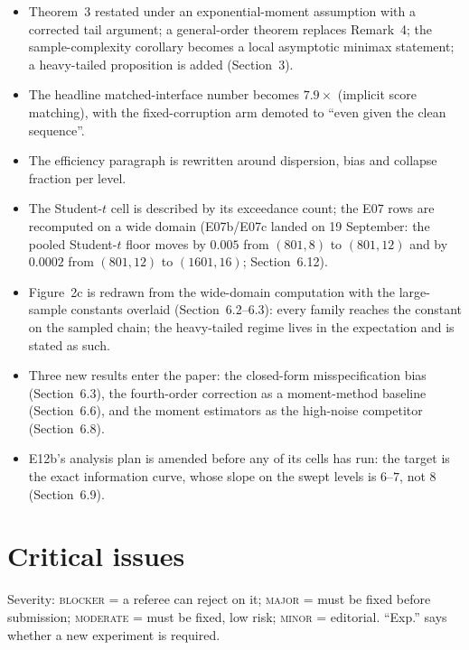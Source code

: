 \documentclass[11pt,a4paper]{article}
\newcommand{\sev}[1]{\textsc{#1}}
\theoremstyle{definition}
\theoremstyle{remark}
\begin{document}
\begin{itemize}
\item Theorem~3 restated under an exponential-moment assumption with a corrected tail argument; a general-order theorem replaces Remark~4; the sample-complexity corollary becomes a local asymptotic minimax statement; a heavy-tailed proposition is added (Section~3).
\item The headline matched-interface number becomes $7.9\times$ (implicit score matching), with the fixed-corruption arm demoted to ``even given the clean sequence''.
\item The efficiency paragraph is rewritten around dispersion, bias and collapse fraction per level.
\item The Student-$t$ cell is described by its exceedance count; the E07 rows are recomputed on a wide domain (E07b/E07c landed on 19 September: the pooled Student-$t$ floor moves by $0.005$ from $(801,8)$ to $(801,12)$ and by $0.0002$ from $(801,12)$ to $(1601,16)$; Section~6.12).
\item Figure~2c is redrawn from the wide-domain computation with the large-sample constants overlaid (Section~6.2--6.3): every family reaches the constant on the sampled chain; the heavy-tailed regime lives in the expectation and is stated as such.
\item Three new results enter the paper: the closed-form misspecification bias (Section~6.3), the fourth-order correction as a moment-method baseline (Section~6.6), and the moment estimators as the high-noise competitor (Section~6.8).
\item E12b's analysis plan is amended before any of its cells has run: the target is the exact information curve, whose slope on the swept levels is $6$--$7$, not $8$ (Section~6.9).
\end{itemize}

\section{Critical issues}
\label{sec:issues}

Severity: \sev{blocker} = a referee can reject on it; \sev{major} = must be fixed before submission; \sev{moderate} = must be fixed, low risk; \sev{minor} = editorial. ``Exp.'' says whether a new experiment is required.
\end{document}
